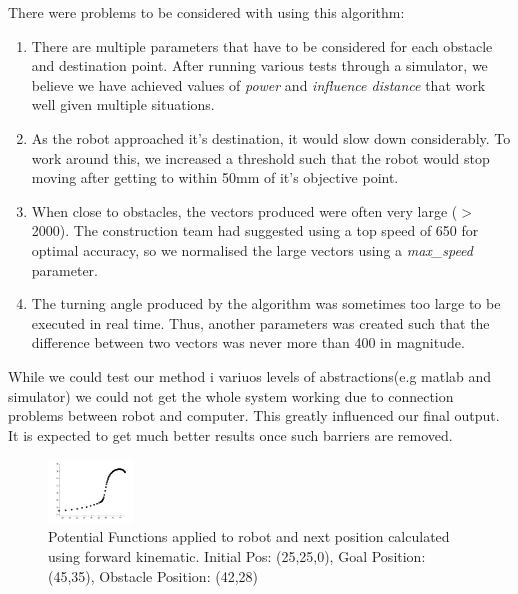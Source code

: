 \documentclass[conference,12pt]{IEEEtran}
\begin{document}
There were problems to be considered with using this algorithm:
\begin{enumerate}
\item There are multiple parameters that have to be considered for each obstacle and destination point. After running various tests through a simulator, we believe we have achieved values of \textit{power} and \textit{influence distance} that work well given multiple situations. 
\item As the robot approached it's destination, it would slow down considerably. To work around this, we increased a threshold such that the robot would stop moving after getting to within 50mm of it's objective point.
\item When close to obstacles, the vectors produced were often very large ($>$2000). The construction team had suggested using a top speed of 650 for optimal accuracy, so we normalised the large vectors using a \textit{max\_speed} parameter.
\item The turning angle produced by the algorithm was sometimes too large to be executed in real time. Thus, another parameters was created such that the difference between two vectors was never more than 400 in magnitude.
\end{enumerate}

While we could test our method i variuos levels of abstractions(e.g matlab and simulator) we could not get the whole system working due to connection problems between robot and computer. This greatly influenced our final output. It is expected to get much better results once such barriers are removed.

\begin{figure}[htp]
\begin{center}
\leavevmode
\includegraphics[width=0.2\textwidth] {PF-obstacle.png}
\end{center}
\caption{Potential Functions applied to robot and next position calculated using forward kinematic. Initial Pos: (25,25,0), Goal Position: (45,35), Obstacle Position: (42,28)}
\label{fig:PF_Path3}
\end{figure}
\vspace{-2 mm}
\end{document}
